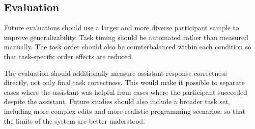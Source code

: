 \subsection{Evaluation}
Future evaluations should use a larger and more diverse participant sample to improve generalizability. Task timing should be automated rather than measured manually. The task order should also be counterbalanced within each condition so that task-specific order effects are reduced.

The evaluation should additionally measure assistant response correctness directly, not only final task correctness. This would make it possible to separate cases where the assistant was helpful from cases where the participant succeeded despite the assistant. Future studies should also include a broader task set, including more complex edits and more realistic programming scenarios, so that the limits of the system are better understood.
